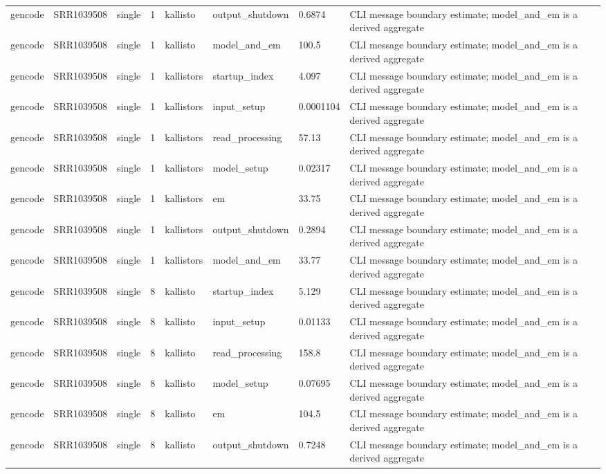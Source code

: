 \begin{tabular}{llllllll}
gencode & SRR1039508 & single & 1 & kallisto & output\_shutdown & 0.6874 & CLI message boundary estimate; model\_and\_em is a derived aggregate \\
gencode & SRR1039508 & single & 1 & kallisto & model\_and\_em & 100.5 & CLI message boundary estimate; model\_and\_em is a derived aggregate \\
gencode & SRR1039508 & single & 1 & kallistors & startup\_index & 4.097 & CLI message boundary estimate; model\_and\_em is a derived aggregate \\
gencode & SRR1039508 & single & 1 & kallistors & input\_setup & 0.0001104 & CLI message boundary estimate; model\_and\_em is a derived aggregate \\
gencode & SRR1039508 & single & 1 & kallistors & read\_processing & 57.13 & CLI message boundary estimate; model\_and\_em is a derived aggregate \\
gencode & SRR1039508 & single & 1 & kallistors & model\_setup & 0.02317 & CLI message boundary estimate; model\_and\_em is a derived aggregate \\
gencode & SRR1039508 & single & 1 & kallistors & em & 33.75 & CLI message boundary estimate; model\_and\_em is a derived aggregate \\
gencode & SRR1039508 & single & 1 & kallistors & output\_shutdown & 0.2894 & CLI message boundary estimate; model\_and\_em is a derived aggregate \\
gencode & SRR1039508 & single & 1 & kallistors & model\_and\_em & 33.77 & CLI message boundary estimate; model\_and\_em is a derived aggregate \\
gencode & SRR1039508 & single & 8 & kallisto & startup\_index & 5.129 & CLI message boundary estimate; model\_and\_em is a derived aggregate \\
gencode & SRR1039508 & single & 8 & kallisto & input\_setup & 0.01133 & CLI message boundary estimate; model\_and\_em is a derived aggregate \\
gencode & SRR1039508 & single & 8 & kallisto & read\_processing & 158.8 & CLI message boundary estimate; model\_and\_em is a derived aggregate \\
gencode & SRR1039508 & single & 8 & kallisto & model\_setup & 0.07695 & CLI message boundary estimate; model\_and\_em is a derived aggregate \\
gencode & SRR1039508 & single & 8 & kallisto & em & 104.5 & CLI message boundary estimate; model\_and\_em is a derived aggregate \\
gencode & SRR1039508 & single & 8 & kallisto & output\_shutdown & 0.7248 & CLI message boundary estimate; model\_and\_em is a derived aggregate \\

\end{tabular}
